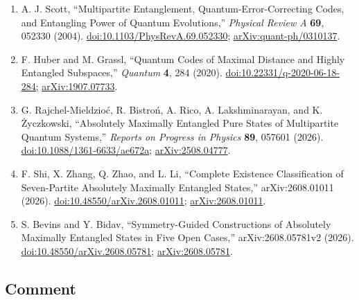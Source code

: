\begin{enumerate}[label={},leftmargin=4.8em,labelsep=0.5em]
  \footnotesize
  \item[\textup{[Sco04]}]\label{ref:p45-scott}
  A. J. Scott,
  ``Multipartite Entanglement, Quantum-Error-Correcting Codes, and Entangling
  Power of Quantum Evolutions,'' \emph{Physical Review A} \textbf{69},
  052330 (2004).
  \href{https://doi.org/10.1103/PhysRevA.69.052330}%
       {doi:10.1103/PhysRevA.69.052330};
  \href{https://arxiv.org/abs/quant-ph/0310137}{arXiv:quant-ph/0310137}.

  \item[\textup{[HG20]}]\label{ref:p45-huber-grassl}
  F. Huber and M. Grassl,
  ``Quantum Codes of Maximal Distance and Highly Entangled Subspaces,''
  \emph{Quantum} \textbf{4}, 284 (2020).
  \href{https://doi.org/10.22331/q-2020-06-18-284}%
       {doi:10.22331/q-2020-06-18-284};
  \href{https://arxiv.org/abs/1907.07733}{arXiv:1907.07733}.

  \item[\textup{[RBR+26]}]\label{ref:p45-review}
  G. Rajchel-Mieldzio{\'c}, R. Bistro{\'n}, A. Rico, A. Lakshminarayan, and
  K. {\.{Z}}yczkowski,
  ``Absolutely Maximally Entangled Pure States of Multipartite Quantum
  Systems,'' \emph{Reports on Progress in Physics} \textbf{89}, 057601
  (2026).
  \href{https://doi.org/10.1088/1361-6633/ae672a}%
       {doi:10.1088/1361-6633/ae672a};
  \href{https://arxiv.org/abs/2508.04777}{arXiv:2508.04777}.

  \item[\textup{[SZZL26]}]\label{ref:p45-shi}
  F. Shi, X. Zhang, Q. Zhao, and L. Li,
  ``Complete Existence Classification of Seven-Partite Absolutely Maximally
  Entangled States,'' arXiv:2608.01011 (2026).
  \href{https://doi.org/10.48550/arXiv.2608.01011}%
       {doi:10.48550/arXiv.2608.01011};
  \href{https://arxiv.org/abs/2608.01011}{arXiv:2608.01011}.

  \item[\textup{[BB26]}]\label{ref:p45-bevins-bidav}
  S. Bevins and Y. Bidav,
  ``Symmetry-Guided Constructions of Absolutely Maximally Entangled States in
  Five Open Cases,'' arXiv:2608.05781v2 (2026).
  \href{https://doi.org/10.48550/arXiv.2608.05781}%
       {doi:10.48550/arXiv.2608.05781};
  \href{https://arxiv.org/abs/2608.05781}{arXiv:2608.05781}.
\end{enumerate}

\subsection*{Comment}

